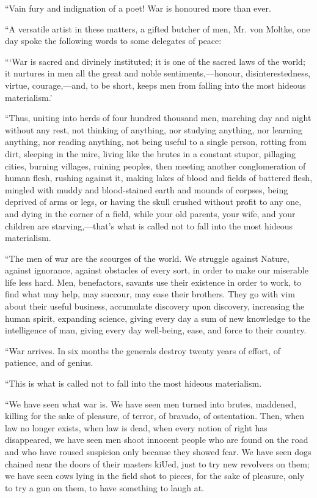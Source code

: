 \documentclass{book}
\begin{document}
“Vain fury and indignation of a poet! War is honoured more than ever.

“A versatile artist in these matters, a gifted butcher of men, Mr. von Moltke, one day spoke the following words to some delegates of peace:

“‘War is sacred and divinely instituted; it is one of the sacred laws of the world; it nurtures in men all the great and noble sentiments,—honour, disinterestedness, virtue, courage,—and, to be short, keeps men from falling into the most hideous materialism.’

“Thus, uniting into herds of four hundred thousand men, marching day and night without any rest, not thinking of anything, nor studying anything, nor learning anything, nor reading anything, not being useful to a single person, rotting from dirt, sleeping in the mire, living like the brutes in a constant stupor, pillaging cities, burning villages, ruining peoples, then meeting another conglomeration of human flesh, rushing against it, making lakes of blood and fields of battered flesh, mingled with muddy and blood-stained earth and mounds of corpses, being deprived of arms or legs, or having the skull crushed without profit to any one, and dying in the corner of a field, while your old parents, your wife, and your children are starving,—that’s what is called not to fall into the most hideous materialism.

“The men of war are the scourges of the world. We struggle against Nature, against ignorance, against obstacles of every sort, in order to make our miserable life less hard. Men, benefactors, savants use their existence in order to work, to find what may help, may succour, may ease their brothers. They go with vim about their useful business, accumulate discovery upon discovery, increasing the human spirit, expanding science, giving every day a sum of new knowledge to the intelligence of man, giving every day well-being, ease, and force to their country.

“War arrives. In six months the generals destroy twenty years of effort, of patience, and of genius.

“This is what is called not to fall into the most hideous materialism.

“We have seen what war is. We have seen men turned into brutes, maddened, killing for the sake of pleasure, of terror, of bravado, of ostentation. Then, when law no longer exists, when law is dead, when every notion of right has disappeared, we have seen men shoot innocent people who are found on the road and who have roused suspicion only because they showed fear. We have seen dogs chained near the doors of their masters kiUed, just to try new revolvers on them; we have seen cows lying in the field shot to pieces, for the sake of pleasure, only to try a gun on them, to have something to laugh at.
\end{document}
